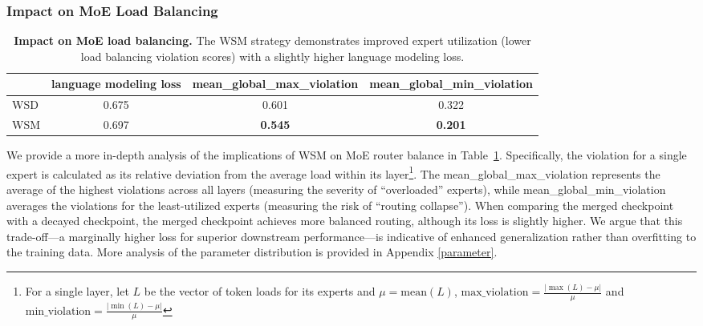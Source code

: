 \subsubsection{Impact on MoE Load Balancing}
\begin{table}[htbp]

\centering
\caption{\textbf{Impact on MoE load balancing.} The WSM strategy demonstrates improved expert utilization (lower load balancing violation scores) with a slightly higher language modeling loss.}
\begin{tabular}{lccc}
\toprule
 & language modeling loss & mean\_global\_max\_violation & mean\_global\_min\_violation \\
\midrule
WSD & 0.675 & 0.601 & 0.322 \\
WSM & 0.697 & \textbf{0.545} & \textbf{0.201} \\
\bottomrule
\end{tabular}
\label{route}
\end{table}

We provide a more in-depth analysis of the implications of WSM on MoE router balance in Table~\ref{route}. Specifically, the violation for a single expert is calculated as its relative deviation from the average load within its layer\footnote{For a single layer, let $L$ be the vector of token loads for its experts and $\mu = \text{mean}(L)$, $\text{max\_violation} = \frac{\lvert \max(L) - \mu \rvert}{\mu}$ and $\text{min\_violation} = \frac{\lvert \min(L) - \mu \rvert}{\mu}$}. The mean\_global\_max\_violation represents the average of the highest violations across all layers (measuring the severity of ``overloaded'' experts), while mean\_global\_min\_violation averages the violations for the least-utilized experts (measuring the risk of ``routing collapse'').
When comparing the merged checkpoint with a decayed checkpoint, the merged checkpoint achieves more balanced routing, although its loss is slightly higher.
We argue that this trade-off—a marginally higher loss for superior downstream performance—is indicative of enhanced generalization rather than overfitting to the training data.
More analysis of the parameter distribution is provided in Appendix \ref{parameter}. 


